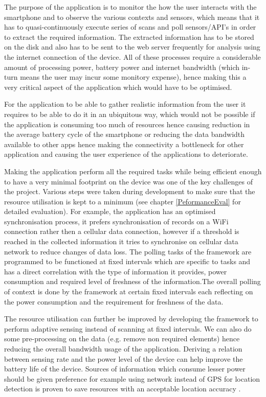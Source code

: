 \documentclass[12pt]{report}
\begin{document}
The purpose of the application is to monitor the how the user interacts with the smartphone and to observe the various contexts and sensors, which means that it has to quasi-continuously execute series of scans and poll sensors/API's in order to extract the required information. The extracted information has to be stored on the disk and also has to be sent to the web server frequently for analysis using the internet connection of the device. All of these processes require a considerable amount of processing power, battery power and internet bandwidth (which in-turn means the user may incur some monitory expense), hence making this a very critical aspect of the application which would have to be optimised.

For the application to be able to gather realistic information from the user it requires to be able to do it in an ubiquitous way, which would not be possible if the application is consuming too much of resources hence causing reduction in the average battery cycle of the smartphone or reducing the data bandwidth available to other apps hence making the connectivity a bottleneck for other application and causing the user experience of the applications to deteriorate. 

Making the application perform all the required tasks while being efficient enough to have a very minimal footprint on the device was one of the key challenges of the project. Various steps were taken during development to make sure that the resource utilisation is kept to a minimum (see chapter \ref{PeformanceEval} for detailed evaluation). For example, the application has an optimised synchronisation process, it prefers synchronisation of records on a WiFi connection rather then a cellular data connection, however if a threshold is reached in the collected information it tries to synchronise on cellular data network to reduce changes of data loss. The polling tasks of the framework are programmed to be functioned at fixed intervals which are specific to tasks and has a direct correlation with the type of information it provides, power consumption and required level of freshness of the information.The overall polling of context is done by the framework at certain fixed intervals each reflecting on the power consumption and the requirement for freshness of the data.

The resource utilisation can further be improved by developing the framework to perform adaptive sensing instead of scanning at fixed intervals. We can also do some pre-processing on the data (e.g. remove non required elements) hence reducing the overall bandwidth usage of the application. Deriving a relation between sensing rate and the power level of the device can help improve the battery life of the device. Sources of information which consume lesser power should be given preference for example using network instead of GPS for location detection is proven to save resources with an acceptable location accuracy \cite{zhuang2010improving}.
\end{document}
